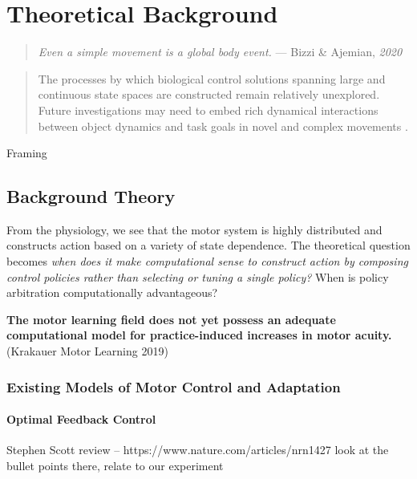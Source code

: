 \documentclass[../main.tex]{subfiles}
\begin{document}
\chapter{Theoretical Background}\label{chap:bg_theory}

\begin{quote}
  \emph{Even a simple movement is a global body event.}
  --- Bizzi \& Ajemian, \emph{2020}
\end{quote}  


\begin{quote}
  The processes by which biological control solutions spanning large and continuous state spaces are constructed remain relatively unexplored. Future investigations may need to embed rich dynamical interactions between object dynamics and task goals in novel and complex movements
  \cite{McNamee2019}.
\end{quote}


Framing 
    

\section{Background Theory}\label{background-theory}

From the physiology, we see that the motor system is highly distributed
and constructs action based on a variety of state dependence. The
theoretical question becomes \emph{when does it make computational sense
to construct action by composing control policies rather than selecting
or tuning a single policy?} When is policy arbitration computationally
advantageous?

\textbf{The motor learning field does not yet possess an adequate
computational model for practice-induced increases in motor acuity.}
(Krakauer Motor Learning 2019)

\subsection{Existing Models of Motor Control and
Adaptation}\label{existing-models-of-motor-control-and-adaptation}

\subsubsection{Optimal Feedback Control}\label{optimal-feedback-control}

Stephen Scott review -- https://www.nature.com/articles/nrn1427 look at
the bullet points there, relate to our experiment
\end{document}
